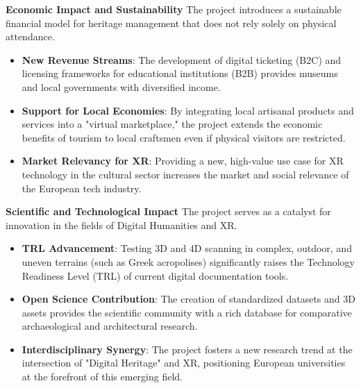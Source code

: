 \textbf{Economic Impact and Sustainability}
The project introduces a sustainable financial model for heritage management that does not rely solely on physical attendance.
\begin{itemize}
    \item \textbf{New Revenue Streams}: The development of digital ticketing (B2C) and licensing frameworks for educational institutions (B2B) provides museums and local governments with diversified income.
    \item \textbf{Support for Local Economies}: By integrating local artisanal products and services into a "virtual marketplace," the project extends the economic benefits of tourism to local craftsmen even if physical visitors are restricted.
    \item \textbf{Market Relevancy for XR}: Providing a new, high-value use case for XR technology in the cultural sector increases the market and social relevance of the European tech industry.
\end{itemize}

\textbf{Scientific and Technological Impact}
The project serves as a catalyst for innovation in the fields of Digital Humanities and XR.
\begin{itemize}
    \item \textbf{TRL Advancement}: Testing 3D and 4D scanning in complex, outdoor, and uneven terrains (such as Greek acropolises) significantly raises the Technology Readiness Level (TRL) of current digital documentation tools.
    \item \textbf{Open Science Contribution}: The creation of standardized datasets and 3D assets provides the scientific community with a rich database for comparative archaeological and architectural research.
    \item \textbf{Interdisciplinary Synergy}: The project fosters a new research trend at the intersection of "Digital Heritage" and XR, positioning European universities at the forefront of this emerging field.
\end{itemize}